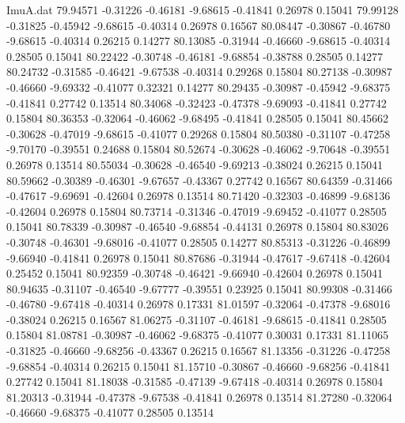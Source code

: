 \begin{filecontents}{ImuA.dat}
  79.94571   -0.31226   -0.46181   -9.68615   -0.41841    0.26978    0.15041
  79.99128   -0.31825   -0.45942   -9.68615   -0.40314    0.26978    0.16567
  80.08447   -0.30867   -0.46780   -9.68615   -0.40314    0.26215    0.14277
  80.13085   -0.31944   -0.46660   -9.68615   -0.40314    0.28505    0.15041
  80.22422   -0.30748   -0.46181   -9.68854   -0.38788    0.28505    0.14277
  80.24732   -0.31585   -0.46421   -9.67538   -0.40314    0.29268    0.15804
  80.27138   -0.30987   -0.46660   -9.69332   -0.41077    0.32321    0.14277
  80.29435   -0.30987   -0.45942   -9.68375   -0.41841    0.27742    0.13514
  80.34068   -0.32423   -0.47378   -9.69093   -0.41841    0.27742    0.15804
  80.36353   -0.32064   -0.46062   -9.68495   -0.41841    0.28505    0.15041
  80.45662   -0.30628   -0.47019   -9.68615   -0.41077    0.29268    0.15804
  80.50380   -0.31107   -0.47258   -9.70170   -0.39551    0.24688    0.15804
  80.52674   -0.30628   -0.46062   -9.70648   -0.39551    0.26978    0.13514
  80.55034   -0.30628   -0.46540   -9.69213   -0.38024    0.26215    0.15041
  80.59662   -0.30389   -0.46301   -9.67657   -0.43367    0.27742    0.16567
  80.64359   -0.31466   -0.47617   -9.69691   -0.42604    0.26978    0.13514
  80.71420   -0.32303   -0.46899   -9.68136   -0.42604    0.26978    0.15804
  80.73714   -0.31346   -0.47019   -9.69452   -0.41077    0.28505    0.15041
  80.78339   -0.30987   -0.46540   -9.68854   -0.44131    0.26978    0.15804
  80.83026   -0.30748   -0.46301   -9.68016   -0.41077    0.28505    0.14277
  80.85313   -0.31226   -0.46899   -9.66940   -0.41841    0.26978    0.15041
  80.87686   -0.31944   -0.47617   -9.67418   -0.42604    0.25452    0.15041
  80.92359   -0.30748   -0.46421   -9.66940   -0.42604    0.26978    0.15041
  80.94635   -0.31107   -0.46540   -9.67777   -0.39551    0.23925    0.15041
  80.99308   -0.31466   -0.46780   -9.67418   -0.40314    0.26978    0.17331
  81.01597   -0.32064   -0.47378   -9.68016   -0.38024    0.26215    0.16567
  81.06275   -0.31107   -0.46181   -9.68615   -0.41841    0.28505    0.15804
  81.08781   -0.30987   -0.46062   -9.68375   -0.41077    0.30031    0.17331
  81.11065   -0.31825   -0.46660   -9.68256   -0.43367    0.26215    0.16567
  81.13356   -0.31226   -0.47258   -9.68854   -0.40314    0.26215    0.15041
  81.15710   -0.30867   -0.46660   -9.68256   -0.41841    0.27742    0.15041
  81.18038   -0.31585   -0.47139   -9.67418   -0.40314    0.26978    0.15804
  81.20313   -0.31944   -0.47378   -9.67538   -0.41841    0.26978    0.13514
  81.27280   -0.32064   -0.46660   -9.68375   -0.41077    0.28505    0.13514

\end{filecontents}
